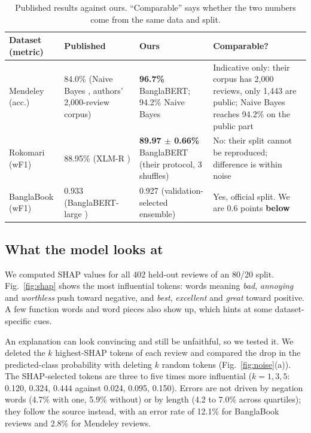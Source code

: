 \documentclass[conference,a4paper]{IEEEtran}
\begin{document}
\begin{table}[!t]
\centering
\caption{Published results against ours. ``Comparable'' says whether the two numbers come from the same data and split.}
\label{tab:pub}
\small
\renewcommand{\arraystretch}{1.15}
\begin{tabular}{@{}lp{3.6cm}p{4.3cm}p{4.9cm}@{}}
\toprule
Dataset (metric) & Published & Ours & Comparable? \\
\midrule
Mendeley (acc.) & 84.0\% (Naive Bayes \cite{hossain2020}, authors' 2,000-review corpus) & \textbf{96.7\%} BanglaBERT; 94.2\% Naive Bayes & Indicative only: their corpus has 2,000 reviews, only 1,443 are public; Naive Bayes reaches 94.2\% on the public part \\
Rokomari (wF1) & 88.95\% (XLM-R \cite{sarker2022}) & \textbf{89.97 $\pm$ 0.66\%} BanglaBERT (their protocol, 3 shuffles) & No: their split cannot be reproduced; difference is within noise \\
BanglaBook (wF1) & 0.933 (BanglaBERT-large \cite{kabir2023}) & 0.927 (validation-selected ensemble) & Yes, official split. We are 0.6 points \textbf{below} \\
\bottomrule
\end{tabular}
\end{table}

\subsection{What the model looks at}
We computed SHAP values for all 402 held-out reviews of an 80/20 split. Fig.~\ref{fig:shap} shows the most influential tokens: words meaning \emph{bad}, \emph{annoying} and \emph{worthless} push toward negative, and \emph{best}, \emph{excellent} and \emph{great} toward positive. A few function words and word pieces also show up, which hints at some dataset-specific cues.

An explanation can look convincing and still be unfaithful, so we tested it. We deleted the $k$ highest-SHAP tokens of each review and compared the drop in the predicted-class probability with deleting $k$ random tokens (Fig.~\ref{fig:noise}(a)). The SHAP-selected tokens are three to five times more influential ($k=1,3,5$: 0.120, 0.324, 0.444 against 0.024, 0.095, 0.150). Errors are not driven by negation words (4.7\% with one, 5.9\% without) or by length (4.2 to 7.0\% across quartiles); they follow the source instead, with an error rate of 12.1\% for BanglaBook reviews and 2.8\% for Mendeley reviews.
\end{document}
